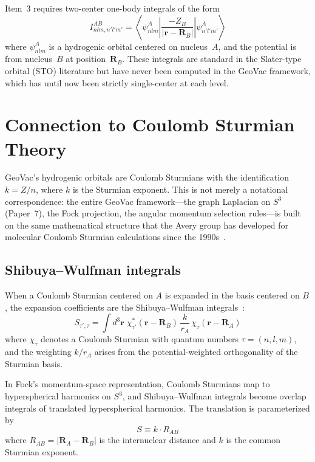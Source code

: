 \documentclass[aps,pra,twocolumn,superscriptaddress,longbibliography]{revtex4-2}
\begin{document}
Item~3 requires two-center one-body integrals of the form
\begin{equation}
\label{eq:vne_cross}
I_{nlm, n'l'm'}^{AB} = \left\langle \psi_{nlm}^A \left|
  \frac{-Z_B}{|\mathbf{r} - \mathbf{R}_B|} \right|
  \psi_{n'l'm'}^A \right\rangle
\end{equation}
where $\psi_{nlm}^A$ is a hydrogenic orbital centered on nucleus~$A$,
and the potential is from nucleus~$B$ at position~$\mathbf{R}_B$.
These integrals are standard in the Slater-type orbital (STO)
literature but have never been computed in the GeoVac framework,
which has until now been strictly single-center at each level.


\section{Connection to Coulomb Sturmian Theory}
\label{sec:sturmian}

GeoVac's hydrogenic orbitals are Coulomb Sturmians with the
identification $k = Z/n$, where $k$ is the Sturmian exponent.
This is not merely a notational correspondence: the entire GeoVac
framework---the graph Laplacian on $S^3$ (Paper~7), the Fock
projection, the angular momentum selection rules---is built on the
same mathematical structure that the Avery group has developed for
molecular Coulomb Sturmian calculations since the
1990s~\cite{avery2000,avery2004,avery2012,avery2014}.

\subsection{Shibuya--Wulfman integrals}

When a Coulomb Sturmian centered on $A$ is expanded in the basis
centered on $B$, the expansion coefficients are the Shibuya--Wulfman
integrals~\cite{shibuya1965}:
\begin{equation}
\label{eq:sw}
S_{\tau', \tau} = \int d^3\mathbf{r}\; \chi_{\tau'}^*(\mathbf{r} -
\mathbf{R}_B)\, \frac{k}{r_A}\, \chi_\tau(\mathbf{r} - \mathbf{R}_A)
\end{equation}
where $\chi_\tau$ denotes a Coulomb Sturmian with quantum numbers
$\tau = (n, l, m)$, and the weighting $k/r_A$ arises from the
potential-weighted orthogonality of the Sturmian basis.

In Fock's momentum-space representation, Coulomb Sturmians map to
hyperspherical harmonics on $S^3$, and Shibuya--Wulfman integrals
become overlap integrals of translated hyperspherical harmonics.
The translation is parameterized by
\begin{equation}
S \equiv k \cdot R_{AB}
\end{equation}
where $R_{AB} = |\mathbf{R}_A - \mathbf{R}_B|$ is the internuclear
distance and $k$ is the common Sturmian exponent.
\end{document}
